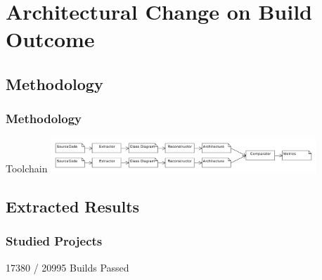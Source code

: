 \documentclass{beamer}
\begin{document}
\section{Architectural Change on Build Outcome}
\subsection{Methodology}
\begin{frame}
\frametitle{Methodology}

\begin{block}{Toolchain}
	\includegraphics[width=10cm]{assets/overview.pdf}
\end{block}
\pause[1]



\end{frame}

\subsection{Extracted Results}
\begin{frame}
	\frametitle{Studied Projects}
	
	17380 / 20995 Builds Passed

	

\end{frame}
\end{document}
